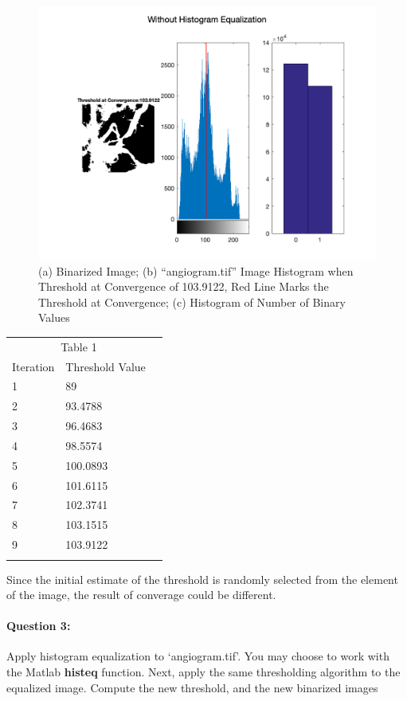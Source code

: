 \documentclass[12pt, letter]{article}
\begin{document}
\begin{figure}
    \centering
    \includegraphics[width=14cm]{without-histogram-equalization.png}
    \caption{(a) Binarized Image; (b) ``angiogram.tif'' Image Histogram when Threshold at Convergence of 103.9122, Red Line Marks the Threshold at Convergence; (c) Histogram of Number of Binary Values}
    \label{fig:q2-1}
\end{figure}

\begin{center}
\begin{tabular}{llr}  
\toprule
\multicolumn{2}{c}{Table 1} \\
\cmidrule(r){1-2}
Iteration   & Threshold Value \\
\midrule
1      & 89 \\
2 & 93.4788 \\
3  & 96.4683 \\
4     & 98.5574 \\
5 & 100.0893 \\
6 & 101.6115 \\
7 & 102.3741 \\
8 & 103.1515 \\
9 & 103.9122 \\
\bottomrule
\label{table:q2-1}
\end{tabular}    
\end{center}

Since the initial estimate of the threshold is randomly selected from the element of the image, the result of converage could be different. 

\paragraph{Question 3:} Apply histogram equalization to ‘angiogram.tif’. You may choose to work with the Matlab \textbf{histeq} function. Next, apply the same thresholding algorithm to the equalized image. Compute the new threshold, and the new binarized images
\end{document}
